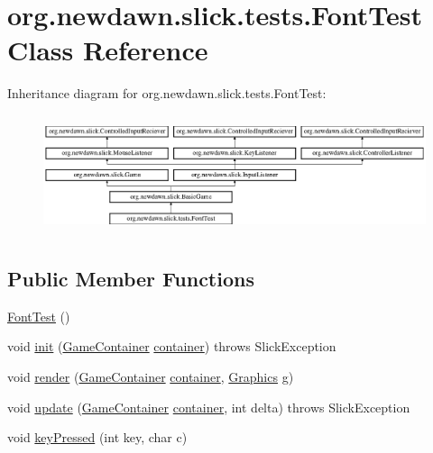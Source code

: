 \hypertarget{classorg_1_1newdawn_1_1slick_1_1tests_1_1_font_test}{}\section{org.\+newdawn.\+slick.\+tests.\+Font\+Test Class Reference}
\label{classorg_1_1newdawn_1_1slick_1_1tests_1_1_font_test}
Inheritance diagram for org.\+newdawn.\+slick.\+tests.\+Font\+Test\+:\begin{figure}[H]
\begin{center}
\leavevmode
\includegraphics[height=3.522012cm]{classorg_1_1newdawn_1_1slick_1_1tests_1_1_font_test}
\end{center}
\end{figure}
\subsection*{Public Member Functions}
\begin{DoxyCompactItemize}
\item 
\mbox{\hyperlink{classorg_1_1newdawn_1_1slick_1_1tests_1_1_font_test_acf10f3c52363190d6336752a54cd1ceb}{Font\+Test}} ()
\item 
void \mbox{\hyperlink{classorg_1_1newdawn_1_1slick_1_1tests_1_1_font_test_a54b4447244c2c947d57f1c9070e5247d}{init}} (\mbox{\hyperlink{classorg_1_1newdawn_1_1slick_1_1_game_container}{Game\+Container}} \mbox{\hyperlink{classorg_1_1newdawn_1_1slick_1_1tests_1_1_font_test_a752b5206f834ae0b0205d67dcb2aa18d}{container}})  throws Slick\+Exception 
\item 
void \mbox{\hyperlink{classorg_1_1newdawn_1_1slick_1_1tests_1_1_font_test_a0903a2695553591dcbc042abbe4f6052}{render}} (\mbox{\hyperlink{classorg_1_1newdawn_1_1slick_1_1_game_container}{Game\+Container}} \mbox{\hyperlink{classorg_1_1newdawn_1_1slick_1_1tests_1_1_font_test_a752b5206f834ae0b0205d67dcb2aa18d}{container}}, \mbox{\hyperlink{classorg_1_1newdawn_1_1slick_1_1_graphics}{Graphics}} g)
\item 
void \mbox{\hyperlink{classorg_1_1newdawn_1_1slick_1_1tests_1_1_font_test_a0abf74d4516d32b8cb985439c22c4dd6}{update}} (\mbox{\hyperlink{classorg_1_1newdawn_1_1slick_1_1_game_container}{Game\+Container}} \mbox{\hyperlink{classorg_1_1newdawn_1_1slick_1_1tests_1_1_font_test_a752b5206f834ae0b0205d67dcb2aa18d}{container}}, int delta)  throws Slick\+Exception 
\item 
void \mbox{\hyperlink{classorg_1_1newdawn_1_1slick_1_1tests_1_1_font_test_a09e35f54a8e1bda5b5955881defa7614}{key\+Pressed}} (int key, char c)
\end{DoxyCompactItemize}
